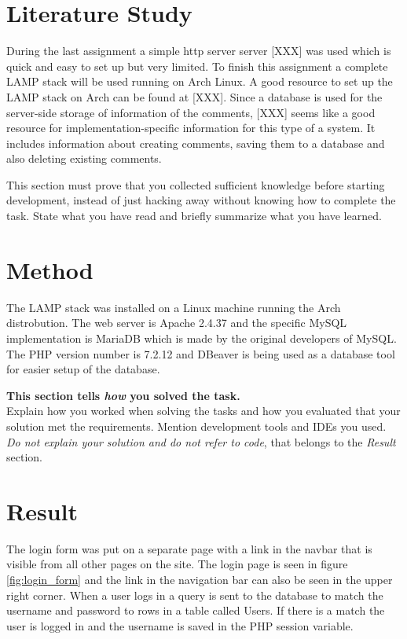 \documentclass[a4paper]{scrartcl}
\begin{document}
\section{Literature Study}

During the last assignment a simple http server server [XXX] was used which is quick and easy to set up but very limited. To finish this assignment a complete LAMP stack will be used running on Arch Linux. A good resource to set up the LAMP stack on Arch can be found at [XXX]. Since a database is used for the server-side storage of information of the comments, [XXX] seems like a good resource for implementation-specific information for this type of a system. It includes information about creating comments, saving them to a database and also deleting existing comments. 


This section must prove that you collected sufficient knowledge before starting development, instead of just hacking away without knowing how to complete the task. State what you have read and briefly summarize what you have learned.

\section{Method}

The LAMP stack was installed on a Linux machine running the Arch distrobution. The web server is Apache 2.4.37 and the specific MySQL implementation is MariaDB which is made by the original developers of MySQL. The PHP version number is 7.2.12 and DBeaver is being used as a database tool for easier setup of the database.

\textbf{This section tells \textit{how} you solved the task.} \\

\noindent Explain how you worked when solving the tasks and how you evaluated that your solution met the requirements. Mention development tools and IDEs you used. \textit{Do not explain your solution and do not refer to code}, that belongs to the \textit{Result} section.

\section{Result}

The login form was put on a separate page with a link in the navbar that is visible from all other pages on the site. The login page is seen in figure \ref{fig:login_form} and the link in the navigation bar can also be seen in the upper right corner. When a user logs in a query is sent to the database to match the username and password to rows in a table called Users. If there is a match the user is logged in and the username is saved in the PHP session variable. 
\end{document}
